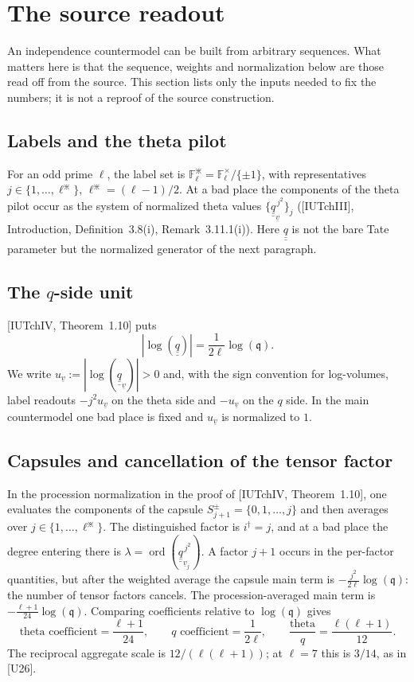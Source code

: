 \documentclass[11pt]{article}
\newcommand{\uu}[1]{\underline{\underline{#1}}}
\theoremstyle{definition}
\begin{document}
\section{The source readout}

An independence countermodel can be built from arbitrary
sequences.  What matters here is that the sequence, weights and
normalization below are those read off from the source.  This
section lists only the inputs needed to fix the numbers; it is
not a reproof of the source construction.

\subsection{Labels and the theta pilot}

For an odd prime $\ell$, the label set is
$\mathbb F_\ell^{\divideontimes}
 =\mathbb F_\ell^\times/\{\pm1\}$, with representatives
$j\in\{1,\ldots,\ell^\divideontimes\}$,
$\ell^\divideontimes=(\ell-1)/2$.  At a bad place the components
of the theta pilot occur as the system of normalized theta values
$\{\uu q_{\underline v}^{\,j^2}\}_j$ ([IUTchIII], Introduction,
Definition~3.8(i), Remark~3.11.1(i)).  Here $\uu q$ is not the
bare Tate parameter but the normalized generator of the next
paragraph.

\subsection{The $q$-side unit}

[IUTchIV, Theorem~1.10] puts
\[
\left|\log(\uu q)\right|
  =\frac1{2\ell}\log(\mathfrak q).
\]
We write $u_{\underline v}:=|\log(\uu q_{\underline v})|>0$ and,
with the sign convention for log-volumes, label readouts
$-j^2u_{\underline v}$ on the theta side and
$-u_{\underline v}$ on the $q$ side.  In the main countermodel
one bad place is fixed and $u_{\underline v}$ is normalized to
$1$.

\subsection{Capsules and cancellation of the tensor factor}

In the procession normalization in the proof of
[IUTchIV, Theorem~1.10], one evaluates the components of the
capsule $S^\pm_{j+1}=\{0,1,\ldots,j\}$ and then averages over
$j\in\{1,\ldots,\ell^\divideontimes\}$.  The distinguished factor
is $i^\dagger=j$, and at a bad place the degree entering there is
$\lambda=\operatorname{ord}(\uu q_{\underline v_j}^{\,j^2})$.
A factor $j+1$ occurs in the per-factor quantities, but after the
weighted average the capsule main term is
$-\frac{j^2}{2\ell}\log(\mathfrak q)$: the number of tensor
factors cancels.  The procession-averaged main term is
$-\frac{\ell+1}{24}\log(\mathfrak q)$.  Comparing coefficients
relative to $\log(\mathfrak q)$ gives
\[
\text{theta coefficient}=\frac{\ell+1}{24},
\qquad
\text{$q$ coefficient}=\frac1{2\ell},
\qquad
\frac{\text{theta}}{\text{$q$}}=\frac{\ell(\ell+1)}{12}.
\]
The reciprocal aggregate scale is $12/(\ell(\ell+1))$; at
$\ell=7$ this is $3/14$, as in [U26].
\end{document}
